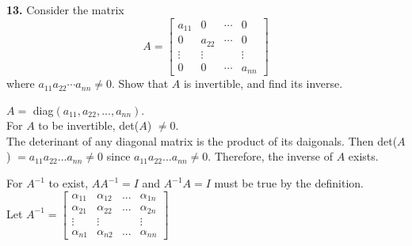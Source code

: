 \documentclass[addpoints]{exam}
\begin{document}
\begin{sloppypar}
\begin{questions}
    \question
    \textbf{13. } Consider the matrix $$ A = \begin{bmatrix}
        a_{11} & 0 & \cdots & 0 \\ 
        0 & a_{22} & \cdots & 0 \\
        \vdots & \vdots & & \vdots \\ 
        0 & 0 & \cdots & a_{nn}
    \end{bmatrix} $$
    where $ a_{11}a_{22}\cdots a_{nn} \neq 0 $. Show that $A$ is invertible, and find its inverse.
    \begin{solution}
        $A = $ diag$ (a_{11}, a_{22}, ..., a_{nn}) $. \\ 
        For $A$ to be invertible, det($A$) $ \neq 0 $. \\ 
        The deterinant of any diagonal matrix is the product of its daigonals. Then det($A$) $ = a_{11}a_{22}...a_{nn} \neq 0 $ since $ a_{11}a_{22}...a_{nn} \neq 0 $. Therefore, the inverse of $A$ exists. 
        
        For $A^{-1}$ to exist, $ AA^{-1} = I $ and $ A^{-1}A = I $ must be true by the definition. \\ 
        Let $ A^{-1} = \begin{bmatrix}
            \alpha_{11} & \alpha_{12} & ... & \alpha_{1n} \\ 
            \alpha_{21} & \alpha_{22} & ... & \alpha_{2n} \\ 
            \vdots & \vdots & & \vdots \\ 
            \alpha_{n1} & \alpha_{n2} & ... & \alpha_{nn}
        \end{bmatrix} $ 
        

\end{solution}
\end{questions}
\end{sloppypar}
\end{document}
